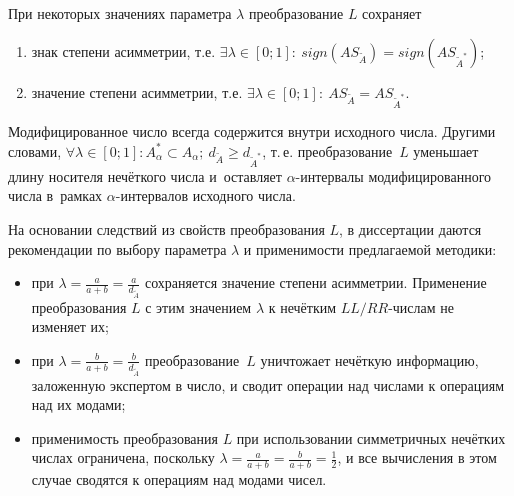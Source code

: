 \begin{prop}
\label{prop:L-prop2}
При некоторых значениях параметра $\lambda$ преобразование $L$ сохраняет
\begin{enumerate}
  \item знак степени асимметрии, т.е. $\exists \lambda \in [0;1]:\ sign(AS_{\tilde A})=sign(AS_{\tilde A^{*}})$;
  \item значение степени асимметрии, т.е. $\exists \lambda \in [0;1]:\ AS_{\tilde A}=AS_{\tilde A^{*}}$.
\end{enumerate}
\end{prop}

\begin{prop}
\label{prop:L-prop3}
Модифицированное число всегда содержится внутри исходного числа. Другими словами, $\forall \lambda \in \left[ 0;1 \right]: A_{\alpha}^{*}\subset A_\alpha;\ d_{\tilde A} \geqslant d_{\tilde A^{*}}$, т.\,е. преобразование~$L$ уменьшает длину носителя нечёткого числа и~оставляет $\alpha$-интервалы модифицированного числа в~рамках $\alpha$-интервалов исходного числа.
\end{prop}

На основании следствий из свойств преобразования $L$, в диссертации даются рекомендации по выбору параметра $\lambda$ и применимости предлагаемой методики:
\begin{itemize}
  \item при $\displaystyle \lambda =\frac{a}{a+b}=\frac{a}{d_{\tilde A}}$ сохраняется значение степени асимметрии. Применение преобразования $L$ с этим значением $\lambda$ к нечётким $LL/RR$-числам не изменяет их;
  \item при $\displaystyle \lambda =\frac{b}{a+b}=\frac{b}{d_{\tilde A}}$ преобразование~$L$ уничтожает нечёткую информацию, заложенную экспертом в число, и сводит операции над числами к операциям над их модами;
  \item применимость преобразования $L$ при использовании симметричных нечётких числах ограничена, поскольку $\displaystyle \lambda =\frac{a}{a+b}=\frac{b}{a+b}=\frac{1}{2}$, и все вычисления в этом случае сводятся к операциям над модами чисел. 
\end{itemize}

